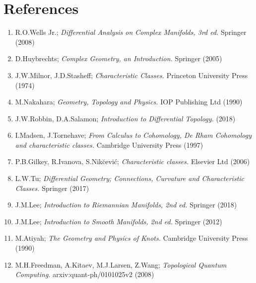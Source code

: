 \documentclass[a4paper]{article}
\theoremstyle{definition} \newtheorem*{definition}{Definition}
\theoremstyle{definition} \newtheorem*{definitions}{Definitions}
\theoremstyle{plain} \newtheorem{theorem}{Theorem}[section]
\theoremstyle{plain} \newtheorem{proposition}[theorem]{Proposition}
\theoremstyle{plain} \newtheorem{corollary}[theorem]{Corollary}
\theoremstyle{plain} \newtheorem{lemma}[theorem]{Lemma}
\theoremstyle{plain} \newtheorem{example}[theorem]{Example}
\begin{document}
\section*{References}
\begin{enumerate}
\item R.O.Wells Jr.; \textit{Differential Analysis on Complex Manifolds, 3rd ed.} Springer (2008)  
\item D.Huybrechts; \textit{Complex Geometry, an Introduction.} Springer (2005)
\item J.W.Milnor, J.D.Stasheff; \textit{Characteristic Classes.} Princeton University Press (1974)
\item M.Nakahara; \textit{Geometry, Topology and Physics.} IOP Publishing Ltd (1990)
\item J.W.Robbin, D.A.Salamon; \textit{Introduction to Differential Topology.} (2018) 
\item I.Madsen, J.Tornehave; \textit{From Calculus to Cohomology, De Rham Cohomology and characteristic classes.} Cambridge University Press (1997)
\item P.B.Gilkey, R.Ivanova, S.Nik{\u c}evi\'c; \textit{Characteristic classes.} Elsevier Ltd (2006)
\item L.W.Tu; \textit{Differential Geometry; Connections, Curvature and Characteristic Classes.} Springer (2017)
\item J.M.Lee; \textit{Introduction to Riemannian Manifolds, 2nd ed.} Springer (2018)
\item J.M.Lee; \textit{Introduction to Smooth Manifolds, 2nd ed.} Springer (2012)
\item M.Atiyah; \textit{The Geometry and Physics of Knots.} Cambridge University Press (1990)
\item M.H.Freedman, A.Kitaev, M.J.Larsen, Z.Wang; \textit{Topological Quantum Computing.} arxiv:quant-ph/0101025v2 (2008)
\end{enumerate}
\end{document}
